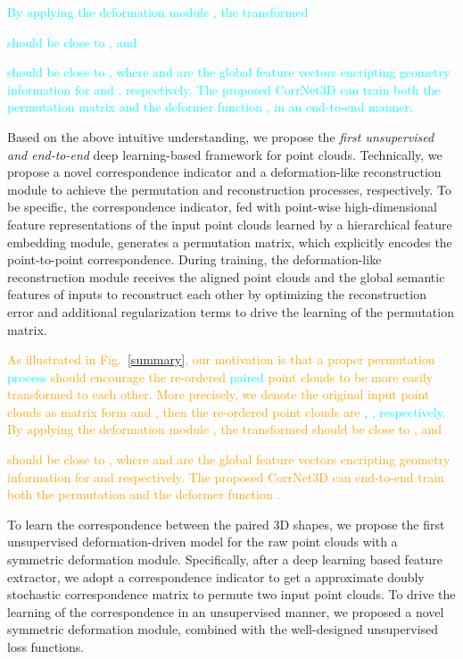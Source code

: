 \documentclass[final]{cvpr}
\newcommand\cyansout{\bgroup\markoverwith{\textcolor{cyan}{\rule[0.5ex]{2pt}{0.4pt}}}\ULon}
\begin{document}
 \textcolor{cyan}{By applying the deformation module , the transformed
 
should be close to , and 

should be close to ,
where  and  are the global feature vectors encripting geometry information for  and , respectively. The proposed CorrNet3D can train both the permutation matrix and the deformer function , in an end-to-end manner.}
 \fi

Based on the above intuitive understanding, we propose the \textit{first unsupervised and end-to-end} deep learning-based framework for point clouds.
Technically, we propose a novel correspondence indicator and a deformation-like reconstruction module to achieve the permutation and reconstruction processes, respectively. To be specific, the correspondence indicator, fed with point-wise high-dimensional feature representations of the input point clouds learned by a hierarchical feature embedding module,   generates a permutation matrix, which explicitly encodes the point-to-point correspondence. During training, the deformation-like reconstruction module receives the aligned point clouds and the global semantic features of inputs to reconstruct each  other by optimizing the reconstruction error and additional regularization terms to drive the learning of the permutation matrix.


\textcolor{orange}{
As illustrated in Fig.~\ref{summary}, our motivation is that a proper permutation \textcolor{cyan}{process} \cyansout{matrix } should encourage the re-ordered \cyansout{input}\textcolor{cyan}{paired} point clouds to be more easily transformed to each other. More precisely, we denote the original input point clouds as matrix form  and , then the re-ordered point clouds \cyansout{via } are \textcolor{cyan}{, , respectively.} \cyansout{ .} By applying the deformation module , the transformed  
should be close to , and 

should be close to ,
where  and  are the global feature vectors encripting geometry information for  and 
 respectively. The proposed CorrNet3D can end-to-end train both the permutation  and the deformer function .
}
\fi

To learn the correspondence between the paired 3D shapes, we propose the first unsupervised 
deformation-driven model for the raw point clouds with a symmetric deformation module. 
Specifically, after a deep learning based feature extractor, we adopt a correspondence indicator to get a approximate 
doubly stochastic correspondence matrix to permute two input point clouds.
To drive the learning of the
correspondence in an unsupervised manner, we proposed a novel symmetric deformation module, combined with the well-designed unsupervised loss functions.\fi
\end{document}
